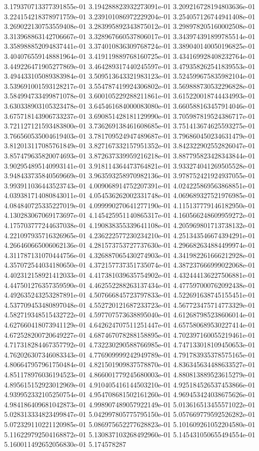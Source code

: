 3.179370713377391855e-01	3.194288823932273091e-01	3.209216728194803636e-01	3.224154218378971759e-01	3.239101086972229204e-01	3.254057126744941408e-01	3.269022130753559408e-01	3.283995892343875012e-01	3.298978205160002508e-01	3.313968863142706667e-01	3.328967660537806017e-01	3.343974391899785514e-01	3.358988852094837441e-01	3.374010836309768724e-01	3.389040140050196825e-01	3.404076559148881964e-01	3.419119889768160725e-01	3.434169928408232764e-01	3.449226471905277869e-01	3.464289317440245597e-01	3.479358262541839553e-01	3.494433105089383984e-01	3.509513643321983123e-01	3.524599675835982104e-01	3.539691001593128217e-01	3.554787419924306802e-01	3.569888730532296828e-01	3.584994733499871078e-01	3.600105229288211861e-01	3.615220018744434993e-01	3.630338903105323478e-01	3.645461684000083080e-01	3.660588163457914046e-01	3.675718143906733237e-01	3.690851428181129990e-01	3.705987819524386717e-01	3.721127121593483800e-01	3.736269138461608685e-01	3.751413674625593275e-01	3.766560535004619403e-01	3.781709524947489687e-01	3.796860450234631479e-01	3.812013117085761849e-01	3.827167332157951352e-01	3.842322902552826047e-01	3.857479635820074693e-01	3.872637339959216218e-01	3.887795823428343844e-01	3.902954895140993141e-01	3.918114364473764821e-01	3.933274041269505528e-01	3.948433735840569669e-01	3.963593258970982136e-01	3.978752421924937055e-01	3.993911036443523743e-01	4.009068914752207391e-01	4.024225869563868851e-01	4.039381714080843011e-01	4.054536262002331748e-01	4.069689327521976985e-01	4.084840725335227019e-01	4.099990270641277190e-01	4.115137779146182950e-01	4.130283067069173697e-01	4.145425951140865317e-01	4.160566248609959272e-01	4.175703777244637038e-01	4.190838355339641108e-01	4.205969801713738132e-01	4.221097935716326965e-01	4.236222577230234210e-01	4.251343546674394291e-01	4.266460665006062136e-01	4.281573753727737630e-01	4.296682634884499974e-01	4.311787131070444756e-01	4.326887065430274903e-01	4.341982261666212928e-01	4.357072544034180650e-01	4.372157737351735074e-01	4.387237666999022068e-01	4.402312158921412033e-01	4.417381039635754902e-01	4.432444136227506881e-01	4.447501276357359590e-01	4.462552288263137434e-01	4.477597000762092438e-01	4.492635243253287891e-01	4.507666845723797833e-01	4.522691638745155451e-01	4.537709453480897048e-01	4.552720121687233723e-01	4.567723475714773329e-01	4.582719348515432722e-01	4.597707573638895040e-01	4.612687985238606014e-01	4.627660418073941129e-01	4.642624707511251447e-01	4.657580689530227414e-01	4.672528200720649227e-01	4.687467078288158895e-01	4.702397160055219461e-01	4.717318284467357792e-01	4.732230290588766985e-01	4.747133018109450653e-01	4.762026307346083343e-01	4.776909999242949789e-01	4.791783935378575165e-01	4.806647957961750484e-01	4.821501909837578870e-01	4.836345634488633527e-01	4.851178976036194523e-01	4.866001779245680003e-01	4.880813889523615279e-01	4.895615152923012969e-01	4.910405416144503210e-01	4.925184526537453866e-01	4.939952332105250754e-01	4.954708681502161260e-01	4.969453424038675626e-01	4.984186409681042873e-01	4.998907489057922149e-01	5.013616513455571022e-01	5.028313334823499847e-01	5.042997805775795150e-01	5.057669779592526282e-01	5.072329110221120985e-01	5.086975652277628823e-01	5.101609261052204580e-01	5.116229792504168872e-01	5.130837103268492960e-01	5.145431050655494554e-01	5.160011492652056830e-01	5.174578287